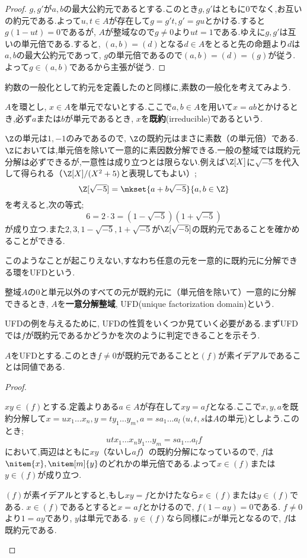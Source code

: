 \begin{proof}
	$g,g'$が$a,b$の最大公約元であるとする.このとき$g,g'$はともに0でなく,お互いの約元である.よって$u,t\in A$が存在して$g=g't,g'=gu$とかける.すると$g(1-ut)=0$であるが, $A$が整域なので$g\neq0$より$ut=1$である.ゆえに$g,g'$は互いの単元倍である.すると, $(a,b)=(d)$となる$d\in A$をとると先の命題より$d$は$a,b$の最大公約元であって, $g$の単元倍であるので$(a,b)=(d)=(g)$が従う.よって$g\in (a,b)$であるから主張が従う.
\end{proof}

約数の一般化として約元を定義したのと同様に,素数の一般化を考えてみよう.

\begin{defi}[既約元]
	$A$を環とし, $x\in A$を単元でないとする.ここで$a,b\in A$を用いて$x=ab$とかけるとき,必ず$a$または$b$が単元であるとき, $x$を\textbf{既約}(irreducible)であるという.
\end{defi}

$\Z$の単元は$1,-1$のみであるので, $\Z$の既約元はまさに素数（の単元倍）である. $\Z$においては,単元倍を除いて一意的に素因数分解できる.一般の整域では既約元分解は必ずできるが,一意性は成り立つとは限らない.例えば$\Z[X]$に$\sqrt{-5}$を代入して得られる（$\Z[X]/(X^2+5)$と表現してもよい）;
\[\Z[\sqrt{-5}]=\mkset{a+b\sqrt{-5}}{a,b\in\Z}\]
を考えると,次の等式;
\[6=2\cdot 3=(1-\sqrt{-5})(1+\sqrt{-5})\]
が成り立つ.また$2,3,1-\sqrt{-5},1+\sqrt{-5}$が$\Z[\sqrt{-5}]$の既約元であることを確かめることができる.

このようなことが起こりえない,すなわち任意の元を一意的に既約元に分解できる環をUFDという.

\begin{defi}[UFD]
	整域$A$の$0$と単元以外のすべての元が既約元に（単元倍を除いて）一意的に分解できるとき, $A$を\textbf{一意分解整域}, UFD(unique factorization domain)という.
\end{defi}

UFDの例を与えるために, UFDの性質をいくつか見ていく必要がある.まずUFDでは$f$が既約元であるかどうかを次のように判定できることを示そう.
\begin{prop}
	$A$をUFDとする.このとき$f\neq0$が既約元であることと$(f)$が素イデアルであることは同値である.
\end{prop}
\begin{proof}
	\begin{eqv}
		\item $xy\in(f)$とする.定義よりある$a\in A$が存在して$xy=af$となる.ここで$x,y,a$を既約分解して$x=ux_1\dots x_n,y=ty_1\dots y_m,a=sa_1\dots a_l~(u,t,s$は$A$の単元)としよう.このとき;
		\[utx_1\dots x_ny_1\dots y_m=sa_1\dots a_lf\]
		において,両辺はともに$xy$（ないし$af$）の既約分解になっているので, $f$は$\nitem{x},\nitem[m]{y}$のどれかの単元倍である.よって$x\in(f)$または$y\in(f)$が成り立つ.
		
		\item $(f)$が素イデアルとすると,もし$xy=f$とかけたなら$x\in (f)$または$y\in(f)$である. $x\in (f)$であるとすると$x=af$とかけるので, $f(1-ay)=0$である. $f\neq0$より$1=ay$であり, $y$は単元である. $y\in (f)$なら同様に$x$が単元となるので, $f$は既約元である.
	\end{eqv}
\end{proof}

